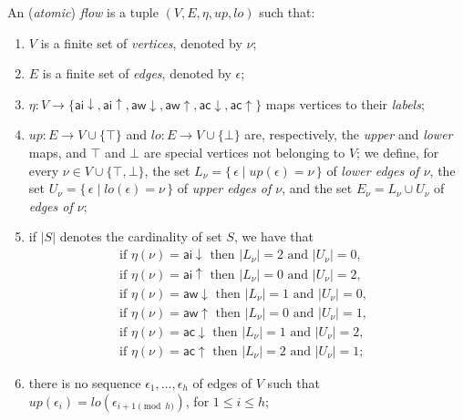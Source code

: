 \documentclass[a4paper]{LMCS}
\begin{document}
\begin{defi}
An (\emph{atomic}) \emph{flow} is a tuple $(V,E,\eta,{{\mathit up}},{{\mathit lo}})$ such that:
\begin{enumerate}
\item $V$ is a finite set of \emph{vertices}, denoted by $\nu$;
\item $E$ is a finite set of \emph{edges}, denoted by $\epsilon$;
\item $\eta\colon V\to\{{{{\mathsf{ai}}{\downarrow}}},{{{\mathsf{ai}}{\uparrow}}},{{{\mathsf{aw}}{\downarrow}}},{{{\mathsf{aw}}{\uparrow}}},{{{\mathsf{ac}}{\downarrow}}},{{{\mathsf{ac}}{\uparrow}}}\}$ maps vertices to their \emph{labels};
\item ${{\mathit up}}\colon E\to V\cup\{\top\}$ and ${{\mathit lo}}\colon E\to V\cup\{\bot\}$ are, respectively, the \emph{upper} and \emph{lower} maps, and $\top$ and $\bot$ are special vertices not belonging to $V$; we define, for every $\nu\in V\cup\{\top,\bot\}$, the set $L_\nu=\{\,\epsilon\mid{{\mathit up}}(\epsilon)=\nu\,\}$ of \emph{lower edges of $\nu$}, the set $U_\nu=\{\,\epsilon\mid{{\mathit lo}}(\epsilon)=\nu\,\}$ of \emph{upper edges of $\nu$}, and the set $E_\nu=L_\nu\cup U_\nu$ of \emph{edges of $\nu$};
\item if ${\mathord\vert S\mathord\vert}$ denotes the cardinality of set $S$, we have that
\begin{align*}
\mbox{if $\eta(\nu)={{{\mathsf{ai}}{\downarrow}}}$ then ${\mathord\vert {L_\nu}\mathord\vert}=2$ and ${\mathord\vert {U_\nu}\mathord\vert}=0$,}&\\
\mbox{if $\eta(\nu)={{{\mathsf{ai}}{\uparrow}}}$ then ${\mathord\vert {L_\nu}\mathord\vert}=0$ and ${\mathord\vert {U_\nu}\mathord\vert}=2$,}&\\
\mbox{if $\eta(\nu)={{{\mathsf{aw}}{\downarrow}}}$ then ${\mathord\vert {L_\nu}\mathord\vert}=1$ and ${\mathord\vert {U_\nu}\mathord\vert}=0$,}&\\
\mbox{if $\eta(\nu)={{{\mathsf{aw}}{\uparrow}}}$ then ${\mathord\vert {L_\nu}\mathord\vert}=0$ and ${\mathord\vert {U_\nu}\mathord\vert}=1$,}&\\
\mbox{if $\eta(\nu)={{{\mathsf{ac}}{\downarrow}}}$ then ${\mathord\vert {L_\nu}\mathord\vert}=1$ and ${\mathord\vert {U_\nu}\mathord\vert}=2$,}&\\
\mbox{if $\eta(\nu)={{{\mathsf{ac}}{\uparrow}}}$ then ${\mathord\vert {L_\nu}\mathord\vert}=2$ and ${\mathord\vert {U_\nu}\mathord\vert}=1$;}&
\end{align*}
\item\label{ItAcycl} there is no sequence $\epsilon_1,\dots,\epsilon_h$ of edges of $V$ such that ${{\mathit up}}(\epsilon_i)={{\mathit lo}}(\epsilon_{i+1\pmod h})$, for $1\le i\le h$;

\end{enumerate}
\end{defi}
\end{document}
